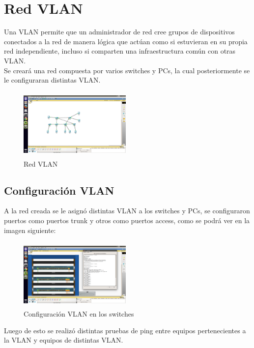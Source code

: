 \documentclass[spanish]{udpreport}
\begin{document}
\section{Red VLAN}

Una  VLAN permite que un administrador de red cree grupos de dispositivos conectados a la red de manera lógica que actúan como si estuvieran en su propia red independiente, incluso si comparten una infraestructura común con otras VLAN.
\\
Se creará una red compuesta por varios switches y PCs, la cual posteriormente se le configuraran distintas VLAN.

\begin{figure}[htb]
\centering
\includegraphics[width=5.5cm, height=3.5cm]{photos/VLAN_red.png}
\caption{Red VLAN} \label{fig:photos/VLAN_red.png}
\end{figure}



\subsection{Configuración VLAN}

A la red creada se le asignó distintas VLAN a los switches y PCs, se configuraron puertos como puertos trunk y otros como puertos access, como se podrá ver en la imagen siguiente:

\begin{figure}[htb]
\centering
\includegraphics[width=5.5cm, height=3.5cm]{photos/VLAN_rack.png}
\caption{Configuración VLAN en los switches} \label{fig:photos/VLAN_rack.png}
\end{figure}

Luego de esto se realizó distintas pruebas de ping entre equipos pertenecientes a la VLAN y equipos de distintas VLAN.
\end{document}
